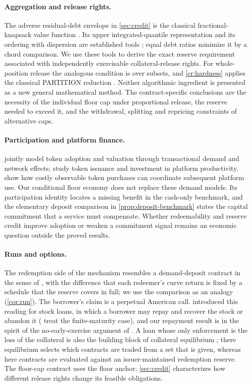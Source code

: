 \paragraph{Aggregation and release rights.}
The adverse residual-debt envelope in \cref{sec:credit} is the classical fractional-knapsack value function \citep{kellerer2004}. Its upper integrated-quantile representation and its ordering with dispersion are established tools \citep{gushchin2017}; equal debt ratios minimize it by a chord comparison. We use these tools to derive the exact reserve requirement associated with independently exercisable collateral-release rights. For whole-position release the analogous condition is over subsets, and \cref{cr:hardness} applies the classical PARTITION reduction \citep{karp1972}. Neither algorithmic ingredient is presented as a new general mathematical method. The contract-specific conclusions are the necessity of the individual floor cap under proportional release, the reserve needed to exceed it, and the withdrawal, splitting and repricing constraints of alternative caps.

\paragraph{Participation and platform finance.}
 jointly model token adoption and valuation through transactional demand and network effects; \citet{cong2022finance} study token issuance and investment in platform productivity.  show how costly observable token purchases can coordinate subsequent platform use. Our conditional floor economy does not replace these demand models. Its participation identity locates a missing benefit in the cash-only benchmark, and the elementary deposit comparison in \cref{prop:deposit-benchmark} states the capital commitment that a service must compensate. Whether redeemability and reserve credit improve adoption or weaken a commitment signal remains an economic question outside the proved results.

\paragraph{Runs and options.} The redemption side of the mechanism resembles a demand-deposit contract in the sense of \citet{diamond1983}, with the difference that each redeemer's curve return is fixed by a schedule that the reserve covers in full; we use the comparison as an analogy (\cref{cor:run}). The borrower's claim is a perpetual American call.  introduced this reading for stock loans, in which a borrower may repay and recover the stock or abandon it (\citet{daixu2011} treat the finite-maturity case), and our repayment result is in the spirit of the no-early-exercise argument of \citet{merton1973}. A loan whose only enforcement is the loss of the collateral is also the building block of collateral equilibrium \citep{geanakoplos2014}; there equilibrium selects which contracts are traded from a set that is given, whereas here contracts are evaluated against an issuer-maintained redemption reserve. The floor-cap contract uses the floor anchor; \cref{sec:credit} characterizes how different release rights change its feasible obligations.

